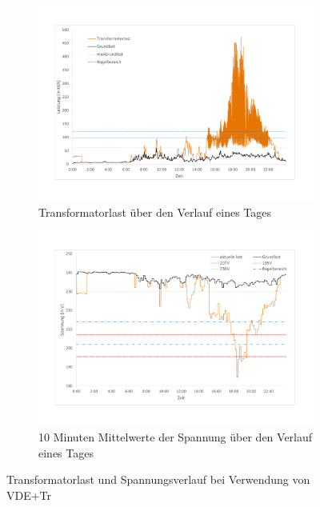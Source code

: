 \begin{figure}
	\begin{subfigure}{\linewidth}
		\includegraphics[scale=0.45]{img/VDE_tau_trafo/TrafoLast3.pdf}
		\caption{Transformatorlast über den Verlauf eines Tages}
		\label{Abb_VDETrafo_TrafoLast}
	\end{subfigure}
	\begin{subfigure}{\linewidth}
		\includegraphics[scale=0.45]{img/VDE_tau_trafo/Spannung3.pdf}
		\caption{10 Minuten Mittelwerte der Spannung über den Verlauf eines Tages}
		\label{Abb_VDETrafo_Spannung}
	\end{subfigure}
	\caption{Transformatorlast und Spannungsverlauf bei Verwendung von VDE+Tr}
\end{figure}

